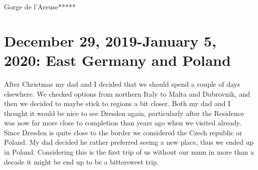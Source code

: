 Gorge de l'Areuse*****\\

\section{December 29, 2019-January 5, 2020: East Germany and Poland}
\label{2019:GermanyPoland}

After Christmas my dad and I decided that we should spend a couple of days elsewhere. We checked options from northern Italy to Malta and Dubrovnik, and then we decided to maybe stick to regions a bit closer. Both my dad and I thought it would be nice to see Dresden again, particularly after the Residence was now far more close to completion than years ago when we visited already. Since Dresden is quite close to the border we considered the Czech republic or Poland. My dad decided he rather preferred seeing a new place, thus we ended up in Poland. Considering this is the first trip of us without our mum in more than a decade it might be end up to be a bittersweet trip.\\

